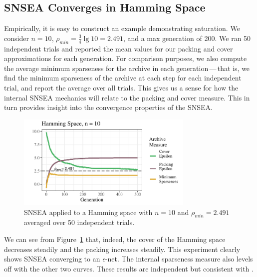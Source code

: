\documentclass[twoside]{article}
\begin{document}
\subsection{SNSEA Converges in Hamming Space}
\label{subsec:hamming}

Empirically, it is easy to construct an example demonstrating saturation.  We consider $n=10$, $\rho_{min} = \frac{3}{4} \lg 10 = 2.491$, and a max generation of 200.  We ran 50 independent trials and reported the mean values for our packing and cover approximations for each generation.  For comparison purposes, we also compute the average minimum sparseness for the archive in each generation\,---\,that is, we find the minimum sparseness of the archive at each step for each independent trial, and report the average over all trials.  This gives us a sense for how the internal SNSEA mechanics will relate to the packing and cover measure.  This in turn provides insight into the convergence properties of the SNSEA.
%
\begin{figure}[h]
  \center\includegraphics[width=0.75\textwidth]{Figures/hamming-500-n10-NOPOP.pdf}
  \caption{\label{fig:hamming:nopop:n10} SNSEA applied to a Hamming space with $n=10$ and $\rho_{min} = 2.491$ averaged over 50 independent trials.}
\end{figure}

We can see from Figure~\ref{fig:hamming:nopop:n10} that, indeed, the cover of the Hamming space decreases steadily and the packing increases steadily.  This experiment clearly shows SNSEA converging to an $\epsilon$-net.  The internal sparseness measure also levels off with the other two curves.  These results are independent but consistent with \citep{Wiegand2020flairs}.  
\end{document}
